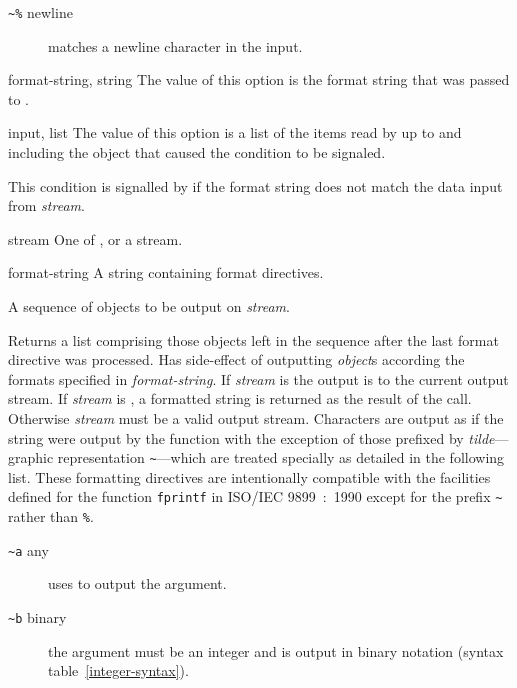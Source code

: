 \begin{optDefinition}
\begin{description}
    \item[{\tt\textasciitilde \%} newline] matches a newline character in the
    input.
\end{description}

%
\begin{initoptions}
    \item[format-string, string] The value of this option is the format string
    that was passed to .
    \item[input, list] The value of this option is a list of the items read by
     up to and including the object that caused the condition
    to be signaled.
\end{initoptions}
%
\remarks%
This condition is signalled by  if the format string does not
match the data input from {\em stream}.

%
\begin{arguments}
    \item[stream] One of \nil, \true\/ or a stream.
    \item[format-string] A string containing format directives.
    \item[\optional{object$_1$ \ldots}] A sequence of objects to be output
    on {\em stream}.
\end{arguments}
%
\result%
Returns a list comprising those objects left in the sequence after the
last format directive was processed.
%
\remarks%
Has side-effect of outputting {\em object\/}s according the formats specified in
{\em format-string}.  If {\em stream\/} is \true\/ the output is to the current
output stream.  If {\em stream\/} is \nil, a formatted string is returned as the
result of the call.  Otherwise {\em stream\/} must be a valid output stream.
Characters are output as if the string were output by the 
function with the exception of those prefixed by {\em tilde\/}---graphic
representation {\tt\textasciitilde}---which are treated specially as detailed in
the following list.  These formatting directives are intentionally compatible
with the facilities defined for the function {\tt fprintf} in ISO/IEC
9899~:~1990 except for the prefix {\tt\textasciitilde} rather than {\tt\%}.
%
\begin{description}
    \item[{\tt\textasciitilde a} any]%
    uses  to output the argument.

    \item[{\tt\textasciitilde b} binary]%
    the argument must be an integer and is output in binary notation
    (syntax table~\ref{integer-syntax}).


\end{description}
\end{optDefinition}
